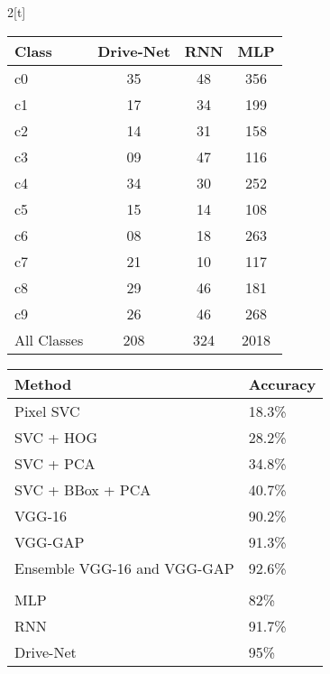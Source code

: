 \clearpage
\begin{multicols}{2}[t]
    \singlespacing%

    \centering
    \label{tab:drive-net.table.2}
    \begin{tabular}{lccc}
    \toprule
    \rowcolor[HTML]{FFFFFF}
    Class       & Drive-Net & RNN & MLP  \\ \midrule
    c0          & 35        & 48  & 356  \\
    c1          & 17        & 34  & 199  \\
    c2          & 14        & 31  & 158  \\
    c3          & 09        & 47  & 116  \\
    c4          & 34        & 30  & 252  \\
    c5          & 15        & 14  & 108  \\
    c6          & 08        & 18  & 263  \\
    c7          & 21        & 10  & 117  \\
    c8          & 29        & 46  & 181  \\
    c9          & 26        & 46  & 268  \\
    \rowcolor[HTML]{EFEFEF}
    All Classes & 208       & 324 & 2018 \\ \bottomrule
    \end{tabular}

\columnbreak%

    \centering
    \label{tab:drive-net.table.1}
    \begin{tabular}{ll}
    \toprule
    \textbf{Method}             & \textbf{Accuracy} \\ \midrule
    Pixel SVC                   & 18.3\%            \\
    SVC + HOG                   & 28.2\%            \\
    SVC + PCA                   & 34.8\%            \\
    SVC + BBox + PCA            & 40.7\%            \\
    VGG-16                      & 90.2\%            \\
    VGG-GAP                     & 91.3\%            \\
    Ensemble VGG-16 and VGG-GAP & 92.6\%            \\
    \multicolumn{2}{l}{\cellcolor[HTML]{C0C0C0}}    \\
    MLP                         & 82\%              \\
    RNN                         & 91.7\%            \\
    Drive-Net                   & 95\%              \\ \bottomrule
    \end{tabular}

\end{multicols}


